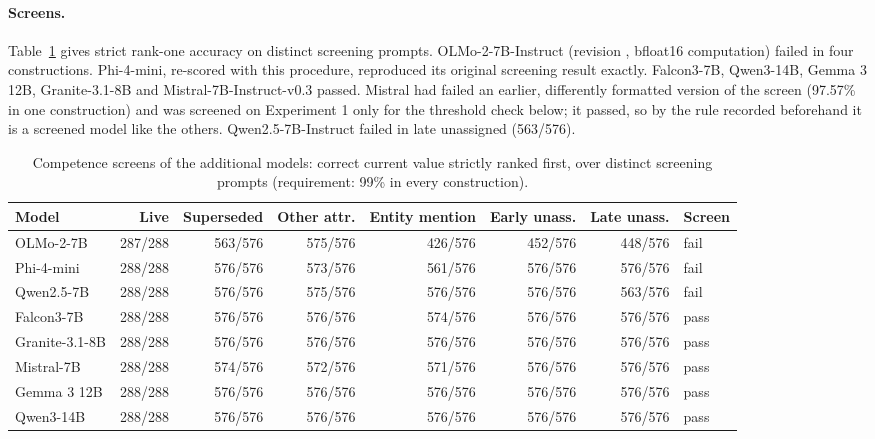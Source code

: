\paragraph{Screens.} Table~\ref{tab:f-screens} gives strict rank-one accuracy on distinct screening prompts. OLMo-2-7B-Instruct (revision , bfloat16 computation) failed in four constructions. Phi-4-mini, re-scored with this procedure, reproduced its original screening result exactly. Falcon3-7B, Qwen3-14B, Gemma 3 12B, Granite-3.1-8B and Mistral-7B-Instruct-v0.3 passed. Mistral had failed an earlier, differently formatted version of the screen (97.57\% in one construction) and was screened on Experiment 1 only for the threshold check below; it passed, so by the rule recorded beforehand it is a screened model like the others. Qwen2.5-7B-Instruct failed in late unassigned (563/576).

\begin{table}[h]
\caption{Competence screens of the additional models: correct current value strictly ranked first, over distinct screening prompts (requirement: 99\% in every construction).}
\label{tab:f-screens}
\begin{center}
\footnotesize
\begin{tabular}{@{}lrrrrrrl@{}}
\toprule
Model & Live & Superseded & Other attr. & Entity mention & Early unass. & Late unass. & Screen \\
\midrule
OLMo-2-7B & 287/288 & 563/576 & 575/576 & 426/576 & 452/576 & 448/576 & fail \\
Phi-4-mini & 288/288 & 576/576 & 573/576 & 561/576 & 576/576 & 576/576 & fail \\
Qwen2.5-7B & 288/288 & 576/576 & 575/576 & 576/576 & 576/576 & 563/576 & fail \\
Falcon3-7B & 288/288 & 576/576 & 576/576 & 574/576 & 576/576 & 576/576 & pass \\
Granite-3.1-8B & 288/288 & 576/576 & 576/576 & 576/576 & 576/576 & 576/576 & pass \\
Mistral-7B & 288/288 & 574/576 & 572/576 & 571/576 & 576/576 & 576/576 & pass \\
Gemma 3 12B & 288/288 & 576/576 & 576/576 & 576/576 & 576/576 & 576/576 & pass \\
Qwen3-14B & 288/288 & 576/576 & 576/576 & 576/576 & 576/576 & 576/576 & pass \\
\bottomrule
\end{tabular}
\end{center}
\end{table}

